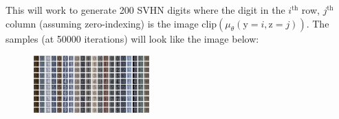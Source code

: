 \begin{enumerate}[label=(\alph*)]
    This will work to generate 200 SVHN digits where the digit in the $i^{\text{th}}$ row, $j^{\text{th}}$ column 
    (assuming zero-indexing) is the image $\text{clip}(\mu_{\theta}(\text{y} = i,\text{z} = j))$. The samples (at 50000 iterations) will look like the image below:

    \begin{figure}[h]
        \centering
        \includegraphics[width=0.4\textwidth]{./figures/fsvae_gen}
    \end{figure}

\end{enumerate}